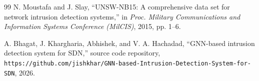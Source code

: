\begin{thebibliography}{99}
 N. Moustafa and J. Slay, ``UNSW-NB15: A comprehensive data set for network intrusion detection systems,'' in \textit{Proc. Military Communications and Information Systems Conference (MilCIS)}, 2015, pp. 1--6.

 A. Bhagat, J. Khargharia, Abhishek, and V. A. Hachadad, ``GNN-based intrusion detection system for SDN,'' source code repository, \\
\texttt{https://github.com/jishkhar/GNN-based-Intrusion-Detection-System-for-SDN}, 2026.

\end{thebibliography}
